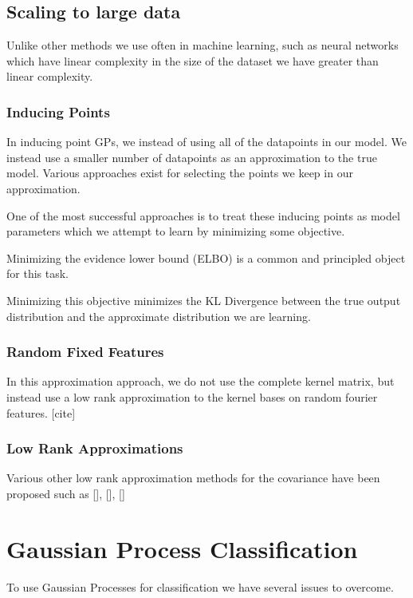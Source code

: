 \documentclass[12pt, a4paper]{report}
\theoremstyle{definition}
\theoremstyle{definition}
\theoremstyle{definition}
\begin{document}
\subsection{Scaling to large data}

Unlike other methods we use often in machine learning, such as neural networks which have linear complexity in the size of the dataset we have greater than linear complexity.

\subsubsection{Inducing Points}

In inducing point GPs, we instead of using all of the datapoints in our model. We instead use a smaller number of datapoints as an approximation to the true model. Various approaches exist for selecting the points we keep in our approximation.

One of the most successful approaches is to treat these inducing points as model parameters which we attempt to learn by minimizing some objective.

Minimizing the evidence lower bound (ELBO) is a common and principled object for this task.

Minimizing this objective minimizes the KL Divergence between the true output distribution and the approximate distribution we are learning.

\subsubsection{Random Fixed Features}

In this approximation approach, we do not use the complete kernel matrix, but instead use a low rank approximation to the kernel bases on random fourier features. [cite]


\subsubsection{Low Rank Approximations}

Various other low rank approximation methods for the covariance have been proposed such as [], [], []



\section{Gaussian Process Classification}


To use Gaussian Processes for classification we have several issues to overcome.
\end{document}
